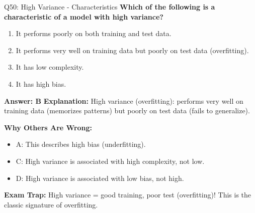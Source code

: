 \documentclass[8pt]{beamer}
\begin{document}
	\begin{frame}{Q50: High Variance - Characteristics}
		\fontsize{6.5}{7.5}\selectfont
		\textbf{Which of the following is a characteristic of a model with high variance?}
		
		\begin{enumerate}
			\item It performs poorly on both training and test data.
			\item It performs very well on training data but poorly on test data (overfitting).
			\item It has low complexity.
			\item It has high bias.
		\end{enumerate}
		
		\vspace{0.05cm}
		\textcolor{myblue}{\textbf{Answer: B}}
		\vspace{0.05cm}
		\textcolor{myblue}{\textbf{Explanation:}} High variance (overfitting): performs very well on training data (memorizes patterns) but poorly on test data (fails to generalize).
		
		\vspace{0.05cm}
		\textcolor{myred}{\textbf{Why Others Are Wrong:}}
		\begin{itemize}
			\item \textcolor{myred}{A:} This describes high bias (underfitting).
			\item \textcolor{myred}{C:} High variance is associated with high complexity, not low.
			\item \textcolor{myred}{D:} High variance is associated with low bias, not high.
		\end{itemize}
		
		\textcolor{myred}{\textbf{Exam Trap:}} High variance = \textcolor{myblue}{good training, poor test} (overfitting)! This is the classic signature of overfitting.
	\end{frame}
	
\end{document}
